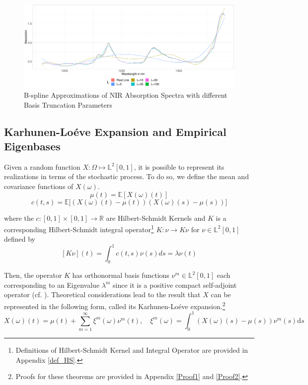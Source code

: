 \documentclass[11pt,twoside,a4paper]{article}
\begin{document}
	\begin{figure}[H]
		\includegraphics[width=\textwidth]{../Graphics/basis_expansions.pdf}
		\caption{B-spline Approximations of NIR Absorption Spectra with different Basis Truncation Parameters}
		\label{Different_Expansions}
	\end{figure}
	
	\subsection{Karhunen-Lo\'{e}ve Expansion and Empirical Eigenbases}\hypertarget{KL}{}
	Given a random function $X: \Omega \mapsto \mathbb{L}^2[0,1]$, it is possible to represent its realizations in terms of the stochastic process. To do so, we define the mean and covariance functions of $X(\omega)$.
	\begin{equation}\label{MeanFunction}
		\mu(t) = \mathbb{E}\left[ X(\omega)(t) \right]
	\end{equation}
	\begin{equation}\label{CovarianceFunction}
		c(t,s) = \mathbb{E}\big[ \left( X(\omega)(t) - \mu(t) \right) \left( X(\omega)(s) - \mu(s) \right) \big]
	\end{equation}

	where the $c: [0,1] \times [0,1] \rightarrow \mathbb{R}$ are Hilbert-Schmidt Kernels and $K$ is a corresponding Hilbert-Schmidt integral operator\footnote{Definitions of Hilbert-Schmidt Kernel and Integral Operator are provided in Appendix \ref{def_HS}.} $K : \nu \rightarrow K \nu$ for $\nu \in \mathbb{L}^{2}[0,1]$ defined by
	\begin{equation}\label{HSKernal}
		[K \nu](t) = \int_{0}^{1}c(t,s) \nu(s)ds = \lambda \nu(t)
	\end{equation}

	Then, the operator $K$ has orthonormal basis functions $\nu^{m} \in \mathbb{L}^{2}[0,1]$ each corresponding to an Eigenvalue $\lambda^{m}$ since it is a positive compact self-adjoint operator (cf. \cite{alexanderian_KLexpansion_2015}).
	Theoretical considerations lead to the result that $X$ can be represented in the following form, called its Karhunen-Lo\'{e}ve expansion.\footnote{Proofs for these theorems are provided in Appendix \ref{Proof1} and \ref{Proof2}.} 
	\begin{equation}\label{KarhunenLoeve}
		X(\omega)(t) = \mu(t) + \sum_{m = 1}^{\infty} \xi^m(\omega) \nu^m(t), \quad \xi^m(\omega) =  \int_{0}^{1} \left(X(\omega)(s) - \mu(s)\right) \nu^m(s) \mathrm{d}s
	\end{equation}
\end{document}
